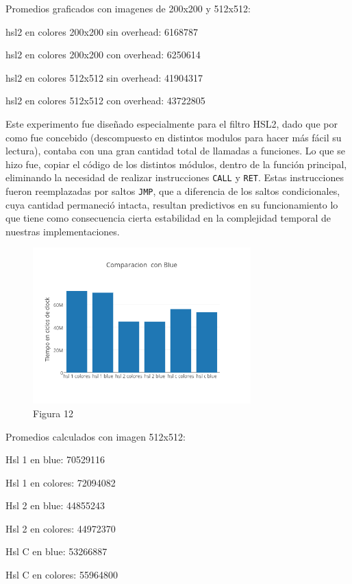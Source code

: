\documentclass[a4paper]{article}
\begin{document}
Promedios graficados con imagenes de 200x200 y 512x512:

hsl2 en colores 200x200 sin overhead: 6168787

hsl2 en colores 200x200 con overhead: 6250614

hsl2 en colores 512x512 sin overhead: 41904317

hsl2 en colores 512x512 con overhead: 43722805

Este experimento fue diseñado especialmente para el filtro HSL2, dado que por como fue concebido (descompuesto en distintos modulos para hacer más fácil su lectura), contaba con una gran cantidad total de llamadas a funciones. Lo que se hizo fue, copiar el código de los distintos módulos, dentro de la función principal, eliminando la necesidad de realizar instrucciones {\tt CALL} y {\tt RET}. Estas instrucciones fueron reemplazadas por saltos {\tt JMP}, que a diferencia de los saltos condicionales, cuya cantidad permaneció intacta, resultan predictivos en su funcionamiento lo que tiene como consecuencia cierta estabilidad en la complejidad temporal de nuestras implementaciones.

\begin{figure}[h]
  \centering
    \includegraphics[width=0.75\textwidth]{imagenes/ComparacionConBlue.png}
  \caption{Figura 12}
  \label{fig:graficohsl6}
\end{figure}
 \FloatBarrier

Promedios calculados con imagen 512x512:

Hsl 1 en blue: 70529116

Hsl 1 en colores: 72094082

Hsl 2 en blue: 44855243

Hsl 2 en colores: 44972370

Hsl C en blue: 53266887

Hsl C en colores: 55964800
\end{document}
